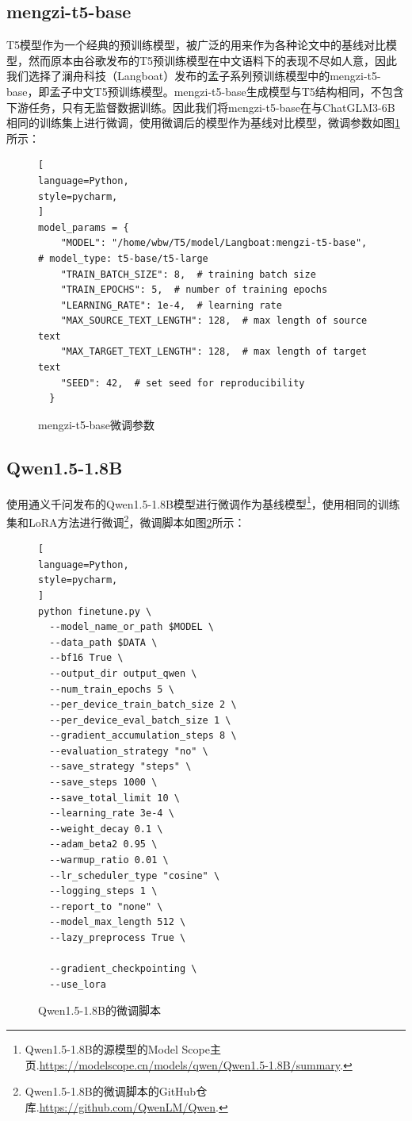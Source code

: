 \documentclass[
    decl-page,  %
    ,fontset = win, %
  ]{njuthesis}
\begin{document}
\subsection{mengzi-t5-base}
T5模型作为一个经典的预训练模型，被广泛的用来作为各种论文中的基线对比模型，然而原本由谷歌发布的T5预训练模型在中文语料下的表现不尽如人意，因此我们选择了澜舟科技（Langboat）发布的孟子系列预训练模型中的mengzi-t5-base\cite{zhang2021mengzi}，即孟子中文T5预训练模型。mengzi-t5-base生成模型与T5结构相同，不包含下游任务，只有无监督数据训练。因此我们将mengzi-t5-base在与ChatGLM3-6B相同的训练集上进行微调，使用微调后的模型作为基线对比模型，微调参数如图\ref{megnzi}所示：

\begin{figure}
    \centering
    {\linespread{1.0}
\begin{lstlisting}[   
language=Python,
style=pycharm,
]
model_params = {
    "MODEL": "/home/wbw/T5/model/Langboat:mengzi-t5-base",  # model_type: t5-base/t5-large
    "TRAIN_BATCH_SIZE": 8,  # training batch size
    "TRAIN_EPOCHS": 5,  # number of training epochs
    "LEARNING_RATE": 1e-4,  # learning rate
    "MAX_SOURCE_TEXT_LENGTH": 128,  # max length of source text
    "MAX_TARGET_TEXT_LENGTH": 128,  # max length of target text
    "SEED": 42,  # set seed for reproducibility
  }
\end{lstlisting}
}
    \caption{mengzi-t5-base微调参数}
    \label{megnzi}
\end{figure}

\subsection{Qwen1.5-1.8B}
使用通义千问发布的Qwen1.5-1.8B模型进行微调作为基线模型\footnote{Qwen1.5-1.8B的源模型的Model Scope主页.\url{https://modelscope.cn/models/qwen/Qwen1.5-1.8B/summary}.}，使用相同的训练集和LoRA方法进行微调\footnote{Qwen1.5-1.8B的微调脚本的GitHub仓库.\url{https://github.com/QwenLM/Qwen}.}，微调脚本如图\ref{qwen-finetune}所示：

\begin{figure}
    \centering
    {\linespread{1.0}
\begin{lstlisting}[   
language=Python,
style=pycharm,
]
python finetune.py \
  --model_name_or_path $MODEL \
  --data_path $DATA \
  --bf16 True \
  --output_dir output_qwen \
  --num_train_epochs 5 \
  --per_device_train_batch_size 2 \
  --per_device_eval_batch_size 1 \
  --gradient_accumulation_steps 8 \
  --evaluation_strategy "no" \
  --save_strategy "steps" \
  --save_steps 1000 \
  --save_total_limit 10 \
  --learning_rate 3e-4 \
  --weight_decay 0.1 \
  --adam_beta2 0.95 \
  --warmup_ratio 0.01 \
  --lr_scheduler_type "cosine" \
  --logging_steps 1 \
  --report_to "none" \
  --model_max_length 512 \
  --lazy_preprocess True \

  --gradient_checkpointing \
  --use_lora

\end{lstlisting}
}
    \caption{Qwen1.5-1.8B的微调脚本}
    \label{qwen-finetune}
\end{figure}
\end{document}
